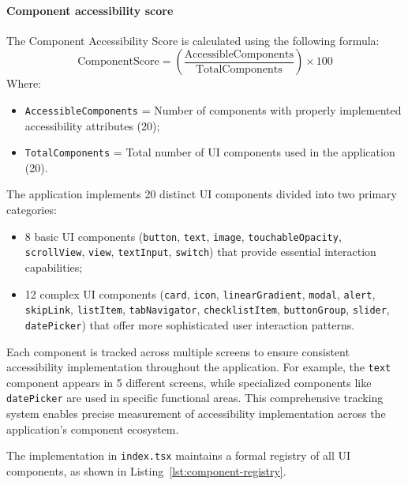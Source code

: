 \paragraph{Component accessibility score}

The Component Accessibility Score is calculated using the following formula:
\begin{equation}
\text{ComponentScore}
= \left(\frac{\text{AccessibleComponents}}{\text{TotalComponents}}\right) \times 100
\end{equation}
Where:
\begin{itemize}
    \item \texttt{AccessibleComponents} = Number of components with properly implemented accessibility attributes (20);
    \item \texttt{TotalComponents} = Total number of UI components used in the application (20).
\end{itemize}

The application implements 20 distinct UI components divided into two primary categories:
\begin{itemize}

\item 8 basic UI components (\texttt{button}, \texttt{text}, \texttt{image}, \texttt{touchableOpacity}, \texttt{scrollView}, \texttt{view}, \texttt{textInput}, \texttt{switch}) that provide essential interaction capabilities;

\item 12 complex UI components (\texttt{card}, \texttt{icon}, \texttt{linearGradient}, \texttt{modal}, \texttt{alert}, \texttt{skipLink}, \texttt{listItem}, \texttt{tabNavigator}, \texttt{checklistItem}, \texttt{buttonGroup}, \texttt{slider}, \texttt{datePicker}) that offer more sophisticated user interaction patterns.

\end{itemize}
Each component is tracked across multiple screens to ensure consistent accessibility implementation throughout the application. For example, the \texttt{text} component appears in 5 different screens, while specialized components like \texttt{datePicker} are used in specific functional areas. This comprehensive tracking system enables precise measurement of accessibility implementation across the application's component ecosystem.

The implementation in \texttt{index.tsx} maintains a formal registry of all UI components, as shown in Listing~\ref{lst:component-registry}.

